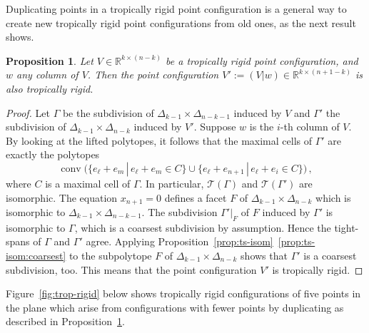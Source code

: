 \documentclass[11pt,a4paper]{amsart}
\newcommand{\RR}{{\mathbb{R}}}
\newcommand{\smallSetOf}[2]{\{#1\,|\,#2\}}
\DeclareMathOperator{\conv}{conv}
\newcommand{\Atightspan}[1]{{\mathcal{T}(#1)}}
\theoremstyle{plain}
\newtheorem{proposition}[theorem]{Proposition}
\theoremstyle{definition}
\begin{document}
Duplicating points in a tropically rigid point configuration is a general way to create new
tropically rigid point configurations from old ones, as the next result shows.

\begin{proposition}\label{prop:duplicate}
  Let $V\in\RR^{k\times(n-k)}$ be a tropically rigid point configuration, and $w$ any column
  of $V$.  Then the point configuration $V':=(V|w)\in\RR^{k\times(n+1-k)}$ is also tropically
  rigid.
\end{proposition}

\begin{proof}
  Let $\Gamma$ be the subdivision of $\Delta_{k-1}\times\Delta_{n-k-1}$ induced by $V$ and $\Gamma'$
  the subdivision of $\Delta_{k-1}\times\Delta_{n-k}$ induced by $V'$.  Suppose $w$ is the $i$-th
  column of $V$.  By looking at the lifted polytopes, it follows that the maximal cells of $\Gamma'$
  are exactly the polytopes
  \[
  \conv\bigl(\smallSetOf{e_\ell+e_m}{e_\ell+e_m \in C} \cup \smallSetOf{e_\ell+e_{n+1}}{e_\ell+e_i\in C}\bigr) \, ,
  \]
  where $C$ is a maximal cell of $\Gamma$.  In particular, $\Atightspan \Gamma$ and
  $\Atightspan{\Gamma'}$ are isomorphic.  The equation $x_{n+1}=0$ defines a facet $F$ of
  $\Delta_{k-1}\times\Delta_{n-k}$ which is isomorphic to $\Delta_{k-1}\times\Delta_{n-k-1}$.  The
  subdivision $\Gamma'|_F$ of $F$ induced by $\Gamma'$ is isomorphic to $\Gamma$, which is a
  coarsest subdivision by assumption. Hence the tight-spans of $\Gamma$ and $\Gamma'$ agree.
  Applying Proposition~\ref{prop:ts-isom}~\eqref{prop:ts-isom:coarsest} to the subpolytope $F$ of
  $\Delta_{k-1}\times\Delta_{n-k}$ shows that $\Gamma'$ is a coarsest subdivision, too.  This means
  that the point configuration $V'$ is tropically rigid.
\end{proof}

Figure~\ref{fig:trop-rigid} below shows tropically rigid configurations of five points in the plane
which arise from configurations with fewer points by duplicating as described in
Proposition~\ref{prop:duplicate}.


\end{document}
